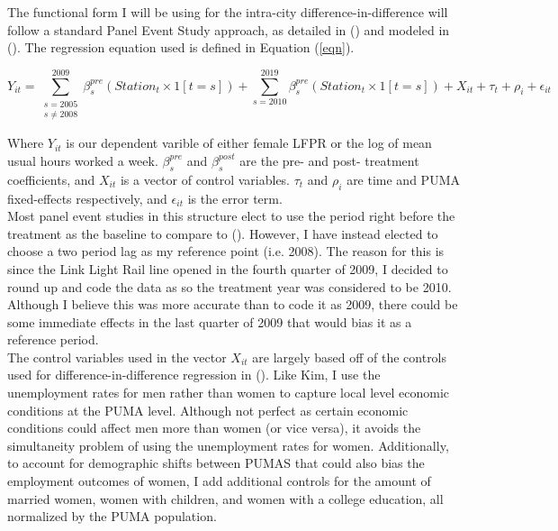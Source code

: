 \documentclass[A4paper,12pt]{article}
\begin{document}
The functional form I will be using for the intra-city difference-in-difference will follow a standard Panel Event Study approach, as detailed in \citeauthor{clarke_implementing_2020} (\citeyear{clarke_implementing_2020}) and modeled in \citeauthor{lowe_religious_2021} (\citeyear{lowe_religious_2021}). The regression equation used is defined in Equation (\ref{eqn}).

\begin{equation}
\label{eqn}
Y_{it} = \sum^{2009}_{\substack{s=2005 \\ s\neq 2008}} \beta^{pre}_s(Station_t \times 1[t=s]) + \sum^{2019}_{s=2010}\beta^{pre}_s(Station_t \times 1[t=s]) + X_{it} + \tau_t + \rho_i + \epsilon_{it} 
\end{equation}

Where $Y_{it}$ is our dependent varible of either female LFPR or the log of mean usual hours worked a week. $\beta^{pre}_s$ and $\beta^{post}_s$ are the pre- and post- treatment coefficients, and $X_{it}$ is a vector of control variables. $\tau_t$ and $\rho_i$ are time and PUMA fixed-effects respectively, and $\epsilon_{it}$ is the error term. \\

Most panel event studies in this structure elect to use the period right before the treatment as the baseline to compare to (\cite{freyaldenhoven_visualization_2021}). However, I have instead elected to choose a two period lag as my reference point (i.e. 2008). The reason for this is since the Link Light Rail line opened in the fourth quarter of 2009, I decided to round up and code the data as so the treatment year was considered to be 2010. Although I believe this was more accurate than to code it as 2009, there could be some immediate effects in the last quarter of 2009 that would bias it as a reference period. \\

The control variables used in the vector $X_{it}$ are largely based off of the controls used for difference-in-difference regression in \citeauthor{kim_subways_2019} (\citeyear{kim_subways_2019}). Like Kim, I use the unemployment rates for men rather than women to capture local level economic conditions at the PUMA level. Although not perfect as certain economic conditions could affect men more than women (or vice versa), it avoids the simultaneity problem of using the unemployment rates for women. Additionally, to account for demographic shifts between PUMAS that could also bias the employment outcomes of women, I add additional controls for the amount of married women, women with children, and women with a college education, all normalized by the PUMA population. \\
\end{document}
